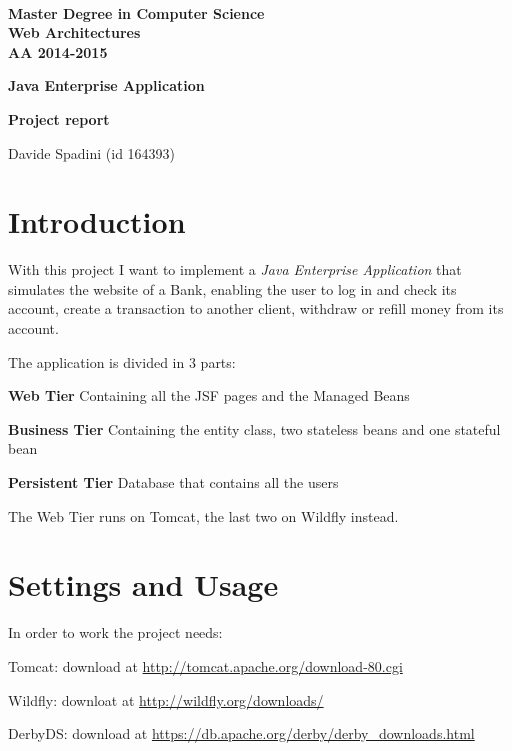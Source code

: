 \documentclass[a4paper]{article}
\begin{document}
\begin{centering}
~~~~~~~~~~~~~\\[-20mm]

  {
  \bfseries Master Degree in Computer Science\\[3mm]
  Web Architectures\\[3mm]
  AA 2014-2015
  }\\[1mm]


  \vspace{0.5cm}
  {
  \Large \bfseries{Java Enterprise Application} \par
  }
  {
  \small \bfseries{Project report} \par
  }
  \vspace{0.2cm}

  {Davide Spadini (id 164393)}

  \vspace{0.3cm}
\end{centering}



\section{Introduction}
\label{sec:intro}
With this project I want to implement a \emph{Java Enterprise Application} that simulates the website of a Bank, enabling the user to log in and check its account, create a transaction to another client, withdraw or refill money from its account.

The application is divided in 3 parts:
\begin{compactitem}
  \item \textbf{Web Tier} Containing all the JSF pages and the Managed Beans
  \item \textbf{Business Tier} Containing the entity class, two stateless beans and one stateful bean
  \item \textbf{Persistent Tier} Database that contains all the users
\end{compactitem}

\noindent
The Web Tier runs on Tomcat, the last two on Wildfly instead.

\section{Settings and Usage}
\label{sec:settings}
In order to work the project needs:
\begin{compactitem}
  \item Tomcat: download at \url{http://tomcat.apache.org/download-80.cgi}
  \item Wildfly: downloat at \url{http://wildfly.org/downloads/}
  \item DerbyDS: download at \url{https://db.apache.org/derby/derby_downloads.html}
\end{compactitem}
\end{document}

